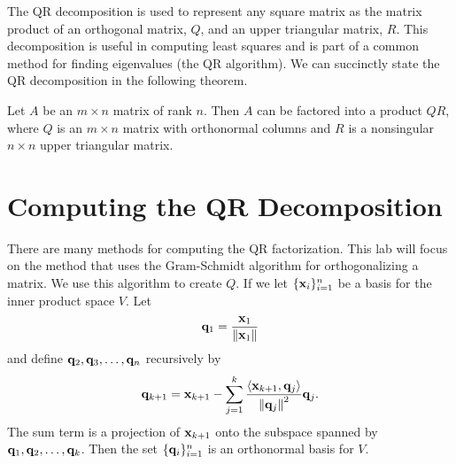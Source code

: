 \label{lab:QRdecomp}


The QR decomposition is used to represent any square matrix as the matrix product of an orthogonal matrix, $Q$, and an upper triangular matrix, $R$.
This decomposition is useful in computing least squares and is part of a common method for finding eigenvalues (the QR algorithm).
We can succinctly state the QR decomposition in the following theorem.
\begin{theorem}
Let $A$ be an $m\times n$ matrix of rank $n$.  Then $A$ can be
factored into a product $Q R$, where $Q$ is an $m\times n$ matrix
with orthonormal columns and $R$ is a nonsingular $n \times n$ upper
triangular matrix.
\end{theorem}

\section*{Computing the QR Decomposition}
There are many methods for computing the QR factorization.
This lab will focus on the method that uses the Gram-Schmidt algorithm for orthogonalizing a matrix.
We use this algorithm to create $Q$.
If we let $\{{\bf x}_i\}_{i=1}^n$ be a basis for the inner product space $V$.
Let \[ {\bf q}_1 = \frac{{\bf x}_1}{\left\lVert{\bf x}_1\right\rVert}\] and define ${\bf q}_2,{\bf q}_3,\ldots,{\bf q}_n$ recursively by
\[ {\bf q}_{k+1} = {\bf x}_{k+1} - \sum^k_{j=1}\frac{\langle {\bf x}_{k+1}, {\bf q}_j\rangle}{\left\lVert{\bf q}_{j}\right\rVert^2}{\bf q}_j .\]
The sum term is a projection of ${\bf x}_{k+1}$ onto the subspace spanned by ${\bf q}_1,{\bf q}_2,\ldots,{\bf q}_k$.
Then the set $\{{\bf q}_i\}_{i=1}^n$ is an orthonormal basis for $V$.

